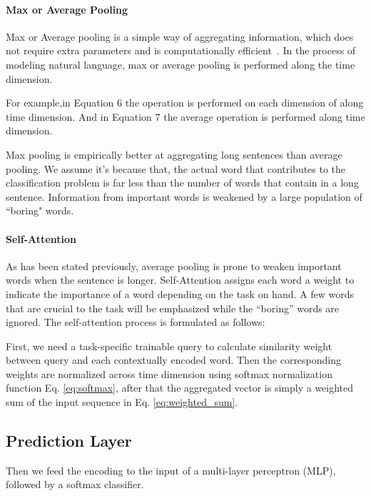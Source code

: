\documentclass[11pt]{article}
\begin{document}
\paragraph{Max or Average Pooling}
Max or Average pooling is a simple way of aggregating information, which does not require extra parameters and is computationally efficient~\cite{kim2014convolutional,zhao2015self,lin2017structured}.
In the process of modeling natural language, max or average pooling is performed along the time dimension.

For example,in Equation 6 the  operation is performed on each dimension of  along time dimension. And in Equation 7 the average operation is  performed along time dimension.

Max pooling is empirically better at aggregating long sentences than average pooling. We assume it's because that, the actual word that contributes to the classification problem is far less than the number of words that contain in a long sentence. Information from important words is weakened by a large population of ``boring" words. 

\paragraph{Self-Attention}
 As has been stated previously, average pooling is prone to weaken important words when the sentence is longer. Self-Attention assigns each word a weight to indicate the importance of a word depending on the task on hand. A few words that are crucial to the task will be emphasized while the ``boring'' words are ignored. The self-attention process is formulated as follows:

First, we need a task-specific trainable query  to calculate similarity weight between query and each contextually encoded word. Then the corresponding weights are normalized across time dimension using softmax normalization function Eq. \ref{eq:softmax}, after that the aggregated vector is simply a weighted sum of the input sequence in Eq. \ref{eq:weighted_sum}.





\subsection{Prediction Layer}

Then we feed the encoding  to the input of a multi-layer perceptron (MLP), followed by a softmax classifier.
 
\end{document}
